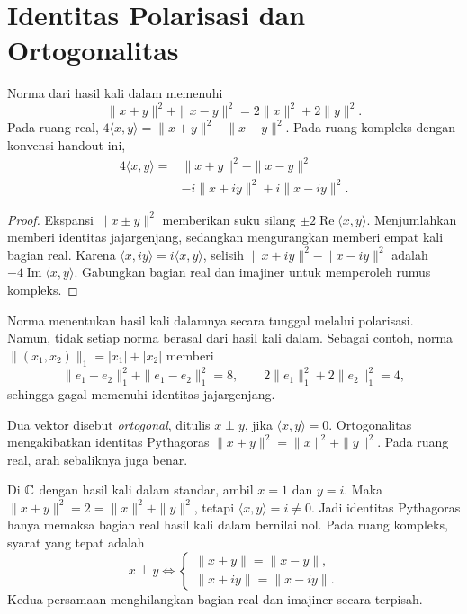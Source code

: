 \section{Identitas Polarisasi dan Ortogonalitas}

\begin{teorema}
    Norma dari hasil kali dalam memenuhi
    \[
        \|x+y\|^2+\|x-y\|^2=2\|x\|^2+2\|y\|^2.
    \]
    Pada ruang real,
    $4\langle x,y\rangle=\|x+y\|^2-\|x-y\|^2$.
    Pada ruang kompleks dengan konvensi handout ini,
    \begin{align*}
        4\langle x,y\rangle
        ={}&\|x+y\|^2-\|x-y\|^2\\
            &-i\|x+iy\|^2+i\|x-iy\|^2.
    \end{align*}
\end{teorema}
\begin{proof}
    Ekspansi $\|x\pm y\|^2$ memberikan suku silang
    $\pm2\operatorname{Re}\langle x,y\rangle$.
    Menjumlahkan memberi identitas jajargenjang, sedangkan
    mengurangkan memberi empat kali bagian real.
    Karena $\langle x,iy\rangle=i\langle x,y\rangle$,
    selisih $\|x+iy\|^2-\|x-iy\|^2$ adalah
    $-4\operatorname{Im}\langle x,y\rangle$.
    Gabungkan bagian real dan imajiner untuk memperoleh rumus kompleks.
\end{proof}

Norma menentukan hasil kali dalamnya secara tunggal melalui
polarisasi. Namun, tidak setiap norma berasal dari hasil kali dalam.
Sebagai contoh, norma $\|(x_1,x_2)\|_1=|x_1|+|x_2|$ memberi
\[
    \|e_1+e_2\|_1^2+\|e_1-e_2\|_1^2=8,
    \qquad 2\|e_1\|_1^2+2\|e_2\|_1^2=4,
\]
sehingga gagal memenuhi identitas jajargenjang.

Dua vektor disebut \emph{ortogonal}, ditulis $x\perp y$, jika
$\langle x,y\rangle=0$. Ortogonalitas mengakibatkan identitas
Pythagoras $\|x+y\|^2=\|x\|^2+\|y\|^2$.
Pada ruang real, arah sebaliknya juga benar.

\begin{exam}
    Di $\mathbb{C}$ dengan hasil kali dalam standar, ambil $x=1$ dan $y=i$.
    Maka $\|x+y\|^2=2=\|x\|^2+\|y\|^2$, tetapi
    $\langle x,y\rangle=i\ne0$.
    Jadi identitas Pythagoras hanya memaksa bagian real hasil
    kali dalam bernilai nol. Pada ruang kompleks, syarat yang tepat adalah
    \[
        x\perp y\iff
        \begin{cases}
            \|x+y\|=\|x-y\|,\\
            \|x+iy\|=\|x-iy\|.
        \end{cases}
    \]
    Kedua persamaan menghilangkan bagian real dan imajiner secara terpisah.
\end{exam}

